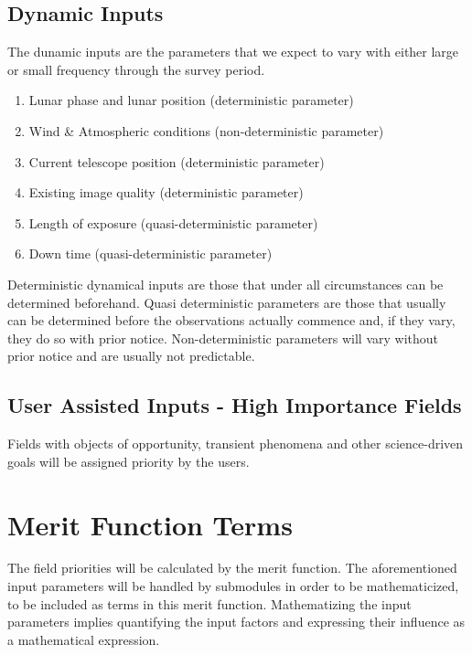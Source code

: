 \documentclass{article}
\begin{document}
\subsection{Dynamic Inputs}
The dunamic inputs are the parameters that we expect to vary with either large or small frequency through the survey period.
\begin{enumerate}
	\item Lunar phase and lunar position (deterministic parameter)\\
	\item Wind \&{} Atmospheric conditions (non-deterministic parameter)\\
	\item Current telescope position (deterministic parameter)\\
	\item Existing image quality (deterministic parameter)\\
	\item Length of exposure (quasi-deterministic parameter)\\
	\item Down time (quasi-deterministic parameter)\\
\end{enumerate}
Deterministic dynamical inputs are those that under all circumstances can be determined beforehand. Quasi deterministic parameters are those that usually can be determined before the observations actually commence and, if they vary, they do so with prior notice. Non-deterministic parameters will vary without prior notice and are usually not predictable.

\subsection{User Assisted Inputs - High Importance Fields}
Fields with objects of opportunity, transient phenomena and other science-driven goals will be assigned priority by the users.

\section{Merit Function Terms}
The field priorities will be calculated by the merit function. The aforementioned input parameters will be handled by submodules in order to be mathematicized, to be included as terms in this merit function. Mathematizing the input parameters implies quantifying the input factors and expressing their influence as a mathematical expression.
\end{document}
